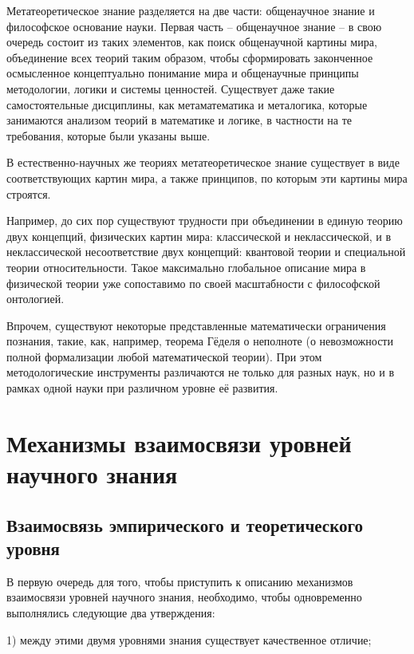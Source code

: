 \documentclass[14pt]{article}
\begin{document}
Метатеоретическое знание разделяется на две части: общенаучное знание и философское основание науки. Первая часть -- общенаучное знание -- в свою очередь состоит из таких элементов, как поиск общенаучной картины мира, объединение всех теорий таким образом, чтобы сформировать законченное осмысленное концептуально понимание мира и общенаучные принципы методологии, логики и системы ценностей. Существует даже такие самостоятельные дисциплины, как метаматематика и металогика, которые занимаются анализом теорий в математике и логике, в частности на те требования, которые были указаны выше.
  
В естественно-научных же теориях метатеоретическое знание существует в виде соответствующих картин мира, а также принципов, по которым эти картины мира строятся.
  
Например, до сих пор существуют трудности при объединении в единую теорию двух концепций, физических картин мира: классической и неклассической, и в неклассической несоответствие двух концепций: квантовой теории и специальной теории относительности. Такое максимально глобальное описание мира в физической теории уже сопоставимо по своей масштабности с философской онтологией.
  
Впрочем, существуют некоторые представленные математически ограничения познания, такие, как, например, теорема Гёделя о неполноте (о невозможности полной формализации любой математической теории). При этом методологические инструменты различаются не только для разных наук, но и в рамках одной науки при различном уровне её развития.
\section{Механизмы взаимосвязи уровней научного знания}

\subsection{Взаимосвязь эмпирического и теоретического уровня}

В первую очередь для того, чтобы приступить к описанию механизмов взаимосвязи уровней научного знания, необходимо, чтобы одновременно выполнялись следующие два утверждения:  
  
1) между этими двумя уровнями знания существует качественное отличие;
  
\end{document}
